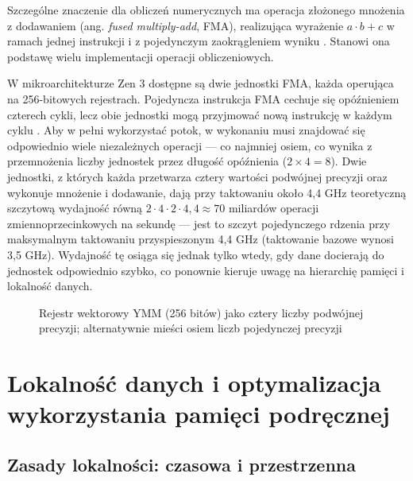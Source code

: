 \documentclass[a4paper,12pt]{book} %
\begin{document}
Szczególne znaczenie dla obliczeń numerycznych ma operacja złożonego mnożenia z dodawaniem (ang. \emph{fused multiply-add}, FMA), realizująca wyrażenie $a \cdot b + c$ w ramach jednej instrukcji i z pojedynczym zaokrągleniem wyniku \cite{ieee754_2008,zhang2019fma}. Stanowi ona podstawę wielu implementacji operacji obliczeniowych.

W mikroarchitekturze Zen 3 dostępne są dwie jednostki FMA, każda operująca na 256-bitowych rejestrach. Pojedyncza instrukcja FMA cechuje się opóźnieniem czterech cykli, lecz obie jednostki mogą przyjmować nową instrukcję w każdym cyklu \cite{fog_microarchitecture}. Aby w pełni wykorzystać potok, w wykonaniu musi znajdować się odpowiednio wiele niezależnych operacji --- co najmniej osiem, co wynika z przemnożenia liczby jednostek przez długość opóźnienia ($2 \times 4 = 8$). Dwie jednostki, z których każda przetwarza cztery wartości podwójnej precyzji oraz wykonuje mnożenie i dodawanie, dają przy taktowaniu około 4,4 GHz teoretyczną szczytową wydajność równą $2 \cdot 4 \cdot 2 \cdot 4{,}4 \approx 70$ miliardów operacji zmiennoprzecinkowych na sekundę --- jest to szczyt pojedynczego rdzenia przy maksymalnym taktowaniu przyspieszonym 4,4 GHz (taktowanie bazowe wynosi 3,5 GHz). Wydajność tę osiąga się jednak tylko wtedy, gdy dane docierają do jednostek odpowiednio szybko, co ponownie kieruje uwagę na hierarchię pamięci i lokalność danych.

\begin{figure}[t!]
\centering
{}
\caption{Rejestr wektorowy YMM (256 bitów) jako cztery liczby podwójnej precyzji; alternatywnie mieści osiem liczb pojedynczej precyzji}
\label{rys:ymm}
\end{figure}
\chapter{Lokalność danych i optymalizacja wykorzystania pamięci podręcznej}
\label{chap:lokalnosc}

\section{Zasady lokalności: czasowa i przestrzenna}
\label{sec:lokalnosc}
\end{document}
